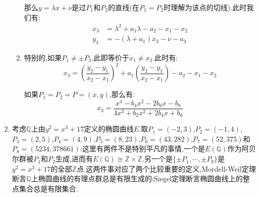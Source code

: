 \begin{enumerate}
\begin{enumerate}
		那么$y=\lambda x+\nu$是过$P_1$和$P_2$的直线(在$P_1=P_2$时理解为该点的切线).此时我们有:
		\begin{align*}
			x_3&=\lambda^2+a_1\lambda-a_2-x_1-x_2\\y_3&=-(\lambda+a_1)x_3-\nu-a_3
		\end{align*}
		\item 特别的,如果$P_1\not=\pm P_2$,此即等价于$x_1\not=x_2$.此时有:
		$$x_3=\left(\frac{y_2-y_1}{x_2-x_1}\right)^2+a_1\left(\frac{y_2-y_1}{x_2-x_1}\right)-a_2-x_1-x_2$$
		
		如果$P_1=P_2=P=(x,y)$,那么有:
		$$x_3=\frac{x^4-b_4x^2-2b_6x-b_8}{4x^3+b_2x^2+2b_4x+b_6}$$
	\end{enumerate}
	\item 考虑$\mathbb{Q}$上由$y^2=x^3+17$定义的椭圆曲线$E$.取$P_1=(-2,3)$,$P_2=(-1,4)$,$P_3=(2,5)$,$P_4=(4,9)$,$P_5=(8,23)$,$P_6=(43,282)$,$P_7=(52,375)$和$P_8=(5234,378661)$.这里有两件不是特别平凡的事情,一个是$E(\mathbb{Q})$作为阿贝尔群被$P_1$和$P_2$生成,进而有$E(\mathbb{Q})\cong\mathbb{Z}\times\mathbb{Z}$.另一个是$\{\pm P_1,\cdots,\pm P_8\}$是$y^2=x^3+17$的全部$\mathbb{Z}$点.这两件事对应了两个比较重要的定义,Mordell-Weil定理断言$\mathbb{Q}$上椭圆曲线的有理点群总是有限生成的;Siegel定理断言椭圆曲线上的整点集合总是有限集合.
\end{enumerate}

